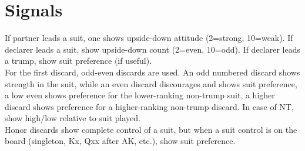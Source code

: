 \documentclass[12pt]{report}
\newcommand{\n}{\\}
\begin{document}
\section{Signals}

    If partner leads a suit, one shows upside-down attitude (2=strong, 10=weak).  If declarer leads a suit, show upside-down count (2=even, 10=odd).  If declarer leads a trump, show suit preference (if useful). \n

    For the first discard, odd-even discards are used.  An odd numbered discard shows strength in the suit, while an even discard discourages and shows suit preference, a low even shows preference for the lower-ranking non-trump suit, a higher discard shows preference for a higher-ranking non-trump discard.  In case of NT, show high/low relative to suit played.\n

    Honor discards show complete control of a suit, but when a suit control is on the board (singleton, Kx, Qxx after AK, etc.), show suit preference.\n
\end{document}
